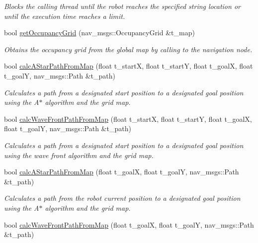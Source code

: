 \begin{DoxyCompactItemize}
\begin{DoxyCompactList}\small\item\em Blocks the calling thread until the robot reaches the specified string location or until the execution time reaches a limit. \end{DoxyCompactList}\item 
bool \hyperlink{class_navigation_tasks_a53046e74add19cc04fcfad6cbac34775}{get\+Occupancy\+Grid} (nav\+\_\+msgs\+::\+Occupancy\+Grid \&t\+\_\+map)
\begin{DoxyCompactList}\small\item\em Obtains the occupancy grid from the global map by calling to the navigation node. \end{DoxyCompactList}\item 
bool \hyperlink{class_navigation_tasks_ac71b80ab71c7aecfbadec887ba7ef4f4}{calc\+A\+Star\+Path\+From\+Map} (float t\+\_\+startX, float t\+\_\+startY, float t\+\_\+goalX, float t\+\_\+goalY, nav\+\_\+msgs\+::\+Path \&t\+\_\+path)
\begin{DoxyCompactList}\small\item\em Calculates a path from a designated start position to a designated goal position using the A$\ast$ algorithm and the grid map. \end{DoxyCompactList}\item 
bool \hyperlink{class_navigation_tasks_a8c3de091359e968b9104edf8ede846b2}{calc\+Wave\+Front\+Path\+From\+Map} (float t\+\_\+startX, float t\+\_\+startY, float t\+\_\+goalX, float t\+\_\+goalY, nav\+\_\+msgs\+::\+Path \&t\+\_\+path)
\begin{DoxyCompactList}\small\item\em Calculates a path from a designated start position to a designated goal position using the wave front algorithm and the grid map. \end{DoxyCompactList}\item 
bool \hyperlink{class_navigation_tasks_acb7a35451918c128f5a630df1463bafe}{calc\+A\+Star\+Path\+From\+Map} (float t\+\_\+goalX, float t\+\_\+goalY, nav\+\_\+msgs\+::\+Path \&t\+\_\+path)
\begin{DoxyCompactList}\small\item\em Calculates a path from the robot current position to a designated goal position using the A$\ast$ algorithm and the grid map. \end{DoxyCompactList}\item 
bool \hyperlink{class_navigation_tasks_a547509a34a1f3af7c39eec7987c9038d}{calc\+Wave\+Front\+Path\+From\+Map} (float t\+\_\+goalX, float t\+\_\+goalY, nav\+\_\+msgs\+::\+Path \&t\+\_\+path)

\end{DoxyCompactItemize}
